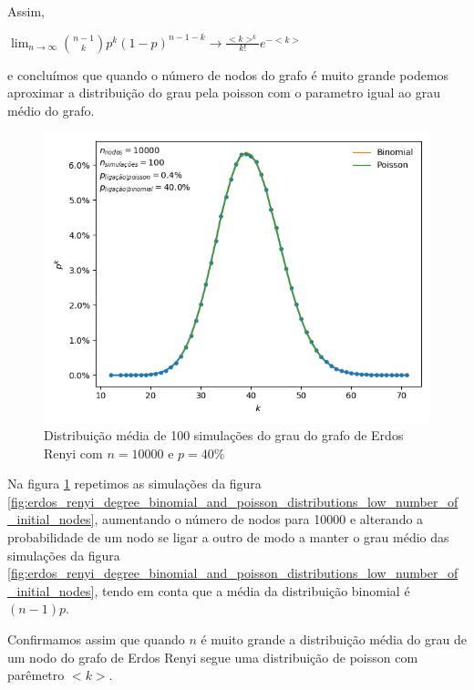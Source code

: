 \documentclass[conference, twocolumn]{IEEEtran}
\theoremstyle{plain}
\theoremstyle{definition}
\theoremstyle{remark}
\begin{document}
Assim,\\

\begin{center}
$\lim_{n\rightarrow \infty} \binom{n-1}{k}p^{k}{(1-p)}^{n-1-k} \rightarrow \frac{<k>^k}{k!}e^{-<k>}$
\end{center}

e concluímos que quando o número de nodos do grafo é muito grande podemos aproximar a distribuição do grau pela poisson com o parametro igual ao grau médio do grafo.

\begin{figure}[h]
    \centering
    \includegraphics[width=1\linewidth]{images/erdos_renyi_degree_binomial_and_poisson_distributions_high_number_of_initial_nodes.png}
    \caption{\small Distribuição média de 100 simulações do grau do grafo de Erdos Renyi com $n = 10000$ e $p = 40\%$}
    \label{fig:erdos_renyi_degree_binomial_and_poisson_distributions_high_number_of_initial_nodes}
\end{figure}

Na figura \ref{fig:erdos_renyi_degree_binomial_and_poisson_distributions_high_number_of_initial_nodes} repetimos as simulações da figura \ref{fig:erdos_renyi_degree_binomial_and_poisson_distributions_low_number_of_initial_nodes}, aumentando o número de nodos para 10000 e alterando a probabilidade de um nodo se ligar a outro de modo a manter o grau médio das simulações da figura \ref{fig:erdos_renyi_degree_binomial_and_poisson_distributions_low_number_of_initial_nodes}, tendo em conta que a média da distribuição binomial é $(n - 1) p$.

Confirmamos assim que quando $n$ é muito grande a distribuição média do grau de um nodo do grafo de Erdos Renyi segue uma distribuição de poisson com parêmetro $<k>$.
\end{document}
